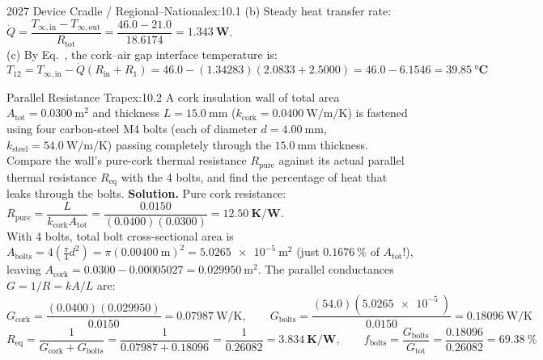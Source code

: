 \begin{workedexample}{2027 Device Cradle / Regional--National}{ex:10.1}
(b) Steady heat transfer rate: $\dot{Q} = \dfrac{T_{\infty,\mathrm{in}} - T_{\infty,\mathrm{out}}}{R_{\mathrm{tot}}} = \dfrac{46.0 - 21.0}{18.6174} = \mathbf{\SI{1.343}{\watt}}$.\\
(c) By Eq.~, the cork--air gap interface temperature is:
\[
  T_{12} = T_{\infty,\mathrm{in}} - \dot{Q}\left(R_{\mathrm{in}} + R_1\right) = 46.0 - (1.34283)(2.0833 + 2.5000) = 46.0 - 6.1546 = \mathbf{\SI{39.85}{\celsius}}
\]
\end{workedexample}

\begin{workedexample}{Parallel Resistance Trap}{ex:10.2}
A cork insulation wall of total area $A_{\mathrm{tot}} = \SI{0.0300}{\square\meter}$ and thickness $L = \SI{15.0}{\milli\meter}$ ($k_{\mathrm{cork}} = \SI{0.0400}{\watt\per\meter\per\kelvin}$) is fastened using four carbon-steel M4 bolts (each of diameter $d = \SI{4.00}{\milli\meter}$, $k_{\mathrm{steel}} = \SI{54.0}{\watt\per\meter\per\kelvin}$) passing completely through the $\SI{15.0}{\milli\meter}$ thickness. Compare the wall's pure-cork thermal resistance $R_{\mathrm{pure}}$ against its actual parallel thermal resistance $R_{\mathrm{eq}}$ with the 4 bolts, and find the percentage of heat that leaks through the bolts.
\tcblower
\textbf{Solution.} Pure cork resistance: $R_{\mathrm{pure}} = \dfrac{L}{k_{\mathrm{cork}}A_{\mathrm{tot}}} = \dfrac{0.0150}{(0.0400)(0.0300)} = \mathbf{\SI{12.50}{\kelvin\per\watt}}$.\\
With 4 bolts, total bolt cross-sectional area is $A_{\mathrm{bolts}} = 4\left(\frac{\pi}{4}d^2\right) = \pi(\SI{0.00400}{\meter})^2 = \SI{5.0265e-5}{\square\meter}$ (just $\SI{0.1676}{\percent}$ of $A_{\mathrm{tot}}$!), leaving $A_{\mathrm{cork}} = 0.0300 - 0.00005027 = \SI{0.029950}{\square\meter}$. The parallel conductances $G = 1/R = kA/L$ are:
\[
  G_{\mathrm{cork}} = \frac{(0.0400)(0.029950)}{0.0150} = \SI{0.07987}{\watt\per\kelvin}, \qquad
  G_{\mathrm{bolts}} = \frac{(54.0)(\SI{5.0265e-5}{})}{0.0150} = \SI{0.18096}{\watt\per\kelvin}
\]
\[
  R_{\mathrm{eq}} = \frac{1}{G_{\mathrm{cork}} + G_{\mathrm{bolts}}} = \frac{1}{0.07987 + 0.18096} = \frac{1}{0.26082} = \mathbf{\SI{3.834}{\kelvin\per\watt}}, \qquad
  f_{\mathrm{bolts}} = \frac{G_{\mathrm{bolts}}}{G_{\mathrm{tot}}} = \frac{0.18096}{0.26082} = \mathbf{\SI{69.38}{\percent}}
\]
\end{workedexample}
